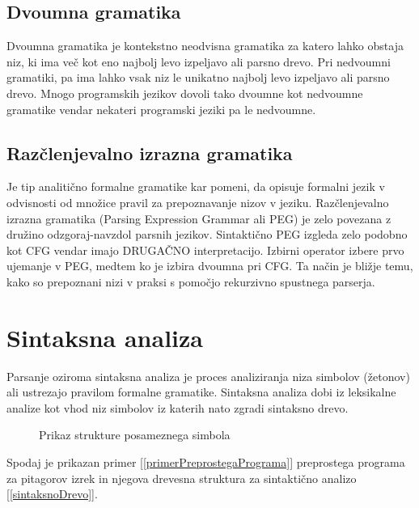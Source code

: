 \documentclass[a4paper, 12pt, tikz, border=5]{book}
\begin{document}
\section{Dvoumna gramatika} %
Dvoumna gramatika je kontekstno neodvisna gramatika za katero lahko obstaja niz, ki ima več kot eno najbolj levo izpeljavo ali parsno drevo. Pri nedvoumni gramatiki, pa ima lahko vsak niz le unikatno najbolj levo izpeljavo ali parsno drevo. Mnogo programskih jezikov dovoli tako dvoumne kot nedvoumne gramatike vendar nekateri programski jeziki pa le nedvoumne. 

\section{Razčlenjevalno izrazna gramatika} %
Je tip analitično formalne gramatike kar pomeni, da opisuje formalni jezik v odvisnosti od množice pravil za prepoznavanje nizov v jeziku. Razčlenjevalno izrazna gramatika (Parsing Expression Grammar ali PEG) je zelo povezana z družino odzgoraj-navzdol parsnih jezikov. Sintaktično PEG izgleda zelo podobno kot CFG vendar imajo DRUGAČNO interpretacijo. Izbirni operator izbere prvo ujemanje v PEG, medtem ko je izbira dvoumna pri CFG. Ta način je bližje temu, kako so prepoznani nizi v praksi s pomočjo rekurzivno spustnega parserja.


\chapter{Sintaksna analiza} %
\label{chSyntaxAnalysis}
Parsanje oziroma sintaksna analiza je proces analiziranja niza simbolov (žetonov) ali ustrezajo pravilom formalne gramatike. Sintaksna analiza dobi iz leksikalne analize kot vhod niz simbolov iz katerih nato zgradi sintaksno drevo. 


\begin{figure}[h!]
\begin{center}
\caption{Prikaz strukture posameznega simbola~\cite{pearson}}
\label{strukturaVhodnihPodatkov}
\end{center}
\end{figure}

Spodaj je prikazan primer [\ref{primerPreprostegaPrograma}] preprostega programa za pitagorov izrek in njegova drevesna struktura za sintaktično analizo [\ref{sintaksnoDrevo}].
\end{document}

